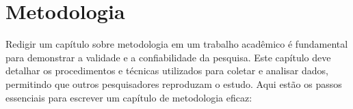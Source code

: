
\chapter{Metodologia}\label{chap:metodologia}

	Redigir um capítulo sobre metodologia em um trabalho acadêmico é fundamental para demonstrar a validade e a confiabilidade da pesquisa. Este capítulo deve detalhar os procedimentos e técnicas utilizados para coletar e analisar dados, permitindo que outros pesquisadores reproduzam o estudo. Aqui estão os passos essenciais para escrever um capítulo de metodologia eficaz:

